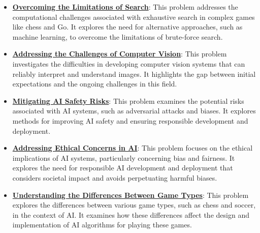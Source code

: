 \documentclass{article}%
\begin{document}
\begin{itemize}[leftmargin=*]
\item \href{https://purdue.brightspace.com/d2l/common/assets/pdfjs-d2l-dist/1.0.14-legacy/web/viewer.html?file=\%2Fcontent\%2Fenforced\%2F1095467-wl.202510.CS.24300.001\%2F02L2-Intro.pdf\%3Fou\%3D1095467\&lang=en-us\&container=d2l-fileviewer-rendered-pdf\&fullscreen=d2l-fileviewer-rendered-pdf-dialog\&height=667#page=11}{\textbf{Overcoming the Limitations of Search}}: This problem addresses the computational challenges associated with exhaustive search in complex games like chess and Go. It explores the need for alternative approaches, such as machine learning, to overcome the limitations of brute{-}force search.%
\item \href{https://purdue.brightspace.com/d2l/common/assets/pdfjs-d2l-dist/1.0.14-legacy/web/viewer.html?file=\%2Fcontent\%2Fenforced\%2F1095467-wl.202510.CS.24300.001\%2F02L2-Intro.pdf\%3Fou\%3D1095467\&lang=en-us\&container=d2l-fileviewer-rendered-pdf\&fullscreen=d2l-fileviewer-rendered-pdf-dialog\&height=667#page=15}{\textbf{Addressing the Challenges of Computer Vision}}: This problem investigates the difficulties in developing computer vision systems that can reliably interpret and understand images. It highlights the gap between initial expectations and the ongoing challenges in this field.%
\item \href{https://purdue.brightspace.com/d2l/common/assets/pdfjs-d2l-dist/1.0.14-legacy/web/viewer.html?file=\%2Fcontent\%2Fenforced\%2F1095467-wl.202510.CS.24300.001\%2F02L2-Intro.pdf\%3Fou\%3D1095467\&lang=en-us\&container=d2l-fileviewer-rendered-pdf\&fullscreen=d2l-fileviewer-rendered-pdf-dialog\&height=667#page=19}{\textbf{Mitigating AI Safety Risks}}: This problem examines the potential risks associated with AI systems, such as adversarial attacks and biases. It explores methods for improving AI safety and ensuring responsible development and deployment.%
\item \href{https://purdue.brightspace.com/d2l/common/assets/pdfjs-d2l-dist/1.0.14-legacy/web/viewer.html?file=\%2Fcontent\%2Fenforced\%2F1095467-wl.202510.CS.24300.001\%2F02L2-Intro.pdf\%3Fou\%3D1095467\&lang=en-us\&container=d2l-fileviewer-rendered-pdf\&fullscreen=d2l-fileviewer-rendered-pdf-dialog\&height=667#page=20}{\textbf{Addressing Ethical Concerns in AI}}: This problem focuses on the ethical implications of AI systems, particularly concerning bias and fairness. It explores the need for responsible AI development and deployment that considers societal impact and avoids perpetuating harmful biases.%
\item \href{https://purdue.brightspace.com/d2l/common/assets/pdfjs-d2l-dist/1.0.14-legacy/web/viewer.html?file=\%2Fcontent\%2Fenforced\%2F1095467-wl.202510.CS.24300.001\%2F02L2-Intro.pdf\%3Fou\%3D1095467\&lang=en-us\&container=d2l-fileviewer-rendered-pdf\&fullscreen=d2l-fileviewer-rendered-pdf-dialog\&height=667#page=27}{\textbf{Understanding the Differences Between Game Types}}: This problem explores the differences between various game types, such as chess and soccer, in the context of AI. It examines how these differences affect the design and implementation of AI algorithms for playing these games.%

\end{itemize}
\end{document}
